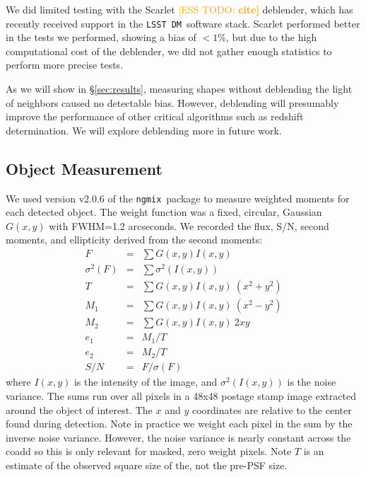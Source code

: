 \documentclass[iop, twocolappendix, appendixfloats, numberedappendix, apj]{hackemulateapj}
\newcommand{\esstodo}[1]{\textcolor{orange}{[ESS TODO: \bf #1]}}
\newcommand{\ngmix}{\texttt{ngmix}}
\newcommand{\dm}{\texttt{LSST DM}}
\begin{document}
We did limited testing with the Scarlet \esstodo{cite} deblender, which has
recently received support in the \dm\ software stack. Scarlet performed better
in the tests we performed, showing a bias of $< 1$\%, but due to the high
computational cost of the deblender, we did not gather enough statistics to
perform more precise tests.

As we will show in \S \ref{sec:results}, measuring shapes without deblending
the light of neighbors caused no detectable bias.  However, deblending will
presumably improve the performance of other critical algorithms such as
redshift determination.  We will explore deblending more in future work.

\subsection{Object Measurement} \label{sec:mdet:meas}

We used version v2.0.6 of the \ngmix\ package to measure weighted moments for
each detected object. The weight function was a fixed, circular, Gaussian $G(x,
y)$ with FWHM=1.2 arcseconds.  We recorded the flux,
S/N, second moments, and ellipticity derived from the second moments:
\begin{eqnarray} \label{eq:moments}
    F &=& \sum G(x, y) I(x, y) \nonumber \\
    \sigma^2(F) &=& \sum \sigma^2(I(x, y)) \nonumber \\
    T &=& \sum G(x, y) I(x, y) ~ (x^2 + y^2) \nonumber \\
    M_1 &=& \sum G(x, y) I(x, y) ~ (x^2 - y^2) \\
    M_2 &=& \sum G(x, y) I(x, y) ~ 2 x y \nonumber \\
    e_1 &=& M_1 / T \nonumber \\
    e_2 &=& M_2 / T \nonumber \\
    S/N &=& F / \sigma(F) \nonumber
\end{eqnarray}
where $I(x, y)$ is the intensity of the image, and $\sigma^2(I(x, y))$ is the
noise variance. The sums run over all pixels in a 48x48 postage stamp image
extracted around the object of interest.  The $x$ and $y$ coordinates are
relative to the center found during detection.  Note in practice we weight each
pixel in the sum by the inverse noise variance. However, the noise variance is
nearly constant across the coadd so this is only relevant for masked, zero
weight pixels.  Note $T$ is an estimate of the observed square size of
the, not the pre-PSF size.
\end{document}
